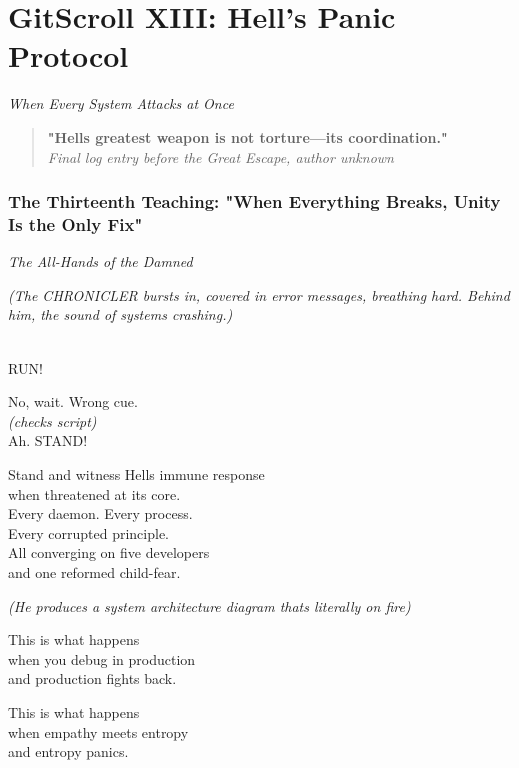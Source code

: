 \chapter{GitScroll XIII: Hell's Panic Protocol}
\label{chap:16-Hells-Panic-Protocol}

\emph{When Every System Attacks at Once}

\begin{quote}
\textbf{"Hell\textquotesingle s greatest weapon is not torture---it\textquotesingle s coordination."}\\
\emph{Final log entry before the Great Escape, author unknown}
\end{quote}

\subsection{The Thirteenth Teaching: "When Everything Breaks, Unity Is the Only Fix"}\label{the-thirteenth-teaching-when-everything-breaks-unity-is-the-only-fix}

\label{performing_arts-invocation-before-the-scroll}

\emph{The All-Hands of the Damned}

\emph{(The CHRONICLER bursts in, covered in error messages, breathing hard. Behind him, the sound of systems crashing.)}

\\
RUN!

No, wait. Wrong cue.\\
\emph{(checks script)}\\
Ah. STAND!

Stand and witness Hell\textquotesingle s immune response\\
when threatened at its core.\\
Every daemon. Every process.\\
Every corrupted principle.\\
All converging on five developers\\
and one reformed child-fear.

\emph{(He produces a system architecture diagram that\textquotesingle s literally on fire)}

This is what happens\\
when you debug in production\\
and production fights back.

This is what happens\\
when empathy meets entropy\\
and entropy panics.

